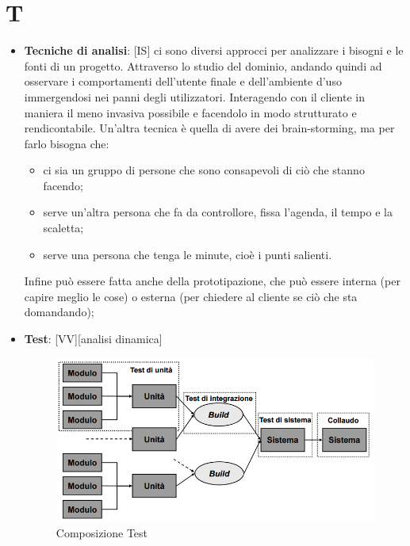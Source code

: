 %
%
%

\section{T} %
\label{sec:t}
	\begin{itemize}
		\item \textbf{Tecniche di analisi}: [IS] ci sono diversi approcci per analizzare i bisogni e le fonti di un progetto. Attraverso lo studio del dominio, andando quindi ad osservare i comportamenti dell'utente finale e dell'ambiente d'uso immergendosi nei panni degli utilizzatori. Interagendo con il cliente in maniera il meno invasiva possibile e facendolo in modo strutturato e rendicontabile. Un'altra tecnica è quella di avere dei brain-storming, ma per farlo bisogna che:
			\begin{itemize}
				\item ci sia un gruppo di persone che sono consapevoli di ciò che stanno facendo;
				\item serve un'altra persona che fa da controllore, fissa l'agenda, il tempo e la scaletta;
				\item serve una persona che tenga le minute, cioè i punti salienti.
			\end{itemize}
		\noindent
		Infine può essere fatta anche della prototipazione, che può essere interna (per capire meglio le cose) o esterna (per chiedere al cliente se ciò che sta domandando);

		\item \textbf{Test}: [VV][analisi dinamica]
			\begin{figure}[htbp]
				\centering
				\includegraphics[scale=0.5]{img/composizione_test.png}
				\caption{Composizione Test}
				\label{fig:comp_test}
			\end{figure}


\end{itemize}
